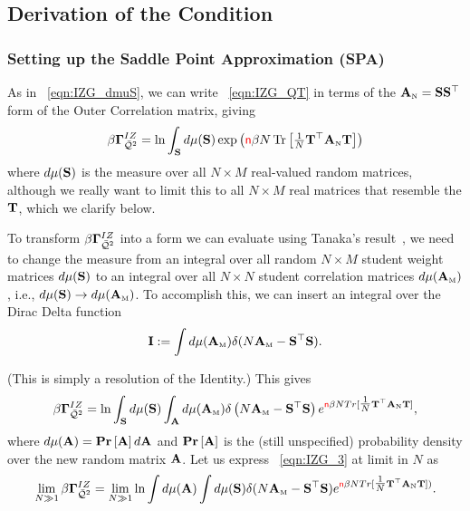 \subsection{Derivation of the \TRACELOG Condition}
\label{sxn:TraceLogDerivation}


\subsubsection{Setting up the Saddle Point Approximation (SPA)}
\label{sxn:TraceLogDerivation_A}
As in \EQN~\ref{eqn:IZG_dmuS}, 
we can write \EQN~\ref{eqn:IZG_QT} in terms of the ${\mathbf{A}}_{\text{\tiny N}} = {\mathbf{S}}{\mathbf{S}}^{\top}$ form of the Outer \Student Correlation matrix, giving
\begin{align}
\beta\mathbf{\Gamma}^{IZ}_{\bar{\mathcal{Q}}^{2}} = \ln\int_{{\mathbf{S}}} d\mu({\mathbf{S}}) \exp\left({\color{red}\sf{n}}\beta N \mbox{}\operatorname{Tr}\left[ \tfrac{1}{N}{\mathbf{T}}^{\top}{\mathbf{A}}_{\text{\tiny N}} {\mathbf{T}} \right] \right)
\end{align}
where $d\mu({\mathbf{S}})$ is the measure over all $N \times M$ real-valued random matrices,
although we really want to limit this to all $N \times M$ real matrices that resemble the \Teacher ${\mathbf{T}}$,
which we clarify below.

To transform $\beta\mathbf{\Gamma}^{IZ}_{\bar{\mathcal{Q}}^{2}}$ into a form we can evaluate using Tanaka's result~\cite{Tanaka2008}, 
we need to change the measure from an integral over all random $N \times M$ student weight matrices
$d\mu({\mathbf{S}})$ to an integral over all $N \times N$
student correlation matrices $d\mu({\mathbf{A}}_{\text{\tiny M}})$, i.e., $d\mu({\mathbf{S}})\rightarrow d\mu({\mathbf{A}}_{\text{\tiny M}})$.
To accomplish this, we can insert an integral over the Dirac Delta function
\begin{align}
  \label{eqn:I}
  \mathbf{I}:=
  \int d\mu({\mathbf{A}}_{\text{\tiny M}})\delta(N{\mathbf{A}}_{\text{\tiny M}}-{\mathbf{S}}^{\top}{\mathbf{S}}).
\end{align}

\noindent
(This is simply a resolution of the Identity.) This gives
\begin{align}
\label{eqn:IZG_3}
\beta\mathbf{\Gamma}^{IZ}_{\bar{\mathcal{Q}}^{2}}= \ln \int_{{\mathbf{S}}} d\mu({\mathbf{S}})\int_{\mathbf{A}} d\mu({\mathbf{A}}_{\text{\tiny M}})
           \delta\left( N{\mathbf{A}}_{\text{\tiny M}}-{\mathbf{S}}^{\top}{\mathbf{S}} \right) 
           e^{ {\color{red}\sf{n}}\beta N Tr[\tfrac{1}{N} {\mathbf{T}}^{\top} {\mathbf{A}}_{\text{\tiny N}}{\mathbf{T}} ] } ,
\end{align}
 where $d\mu(\mathbf{A})=\mbox{}{\bf{Pr}}\left[\mathbf{A}\right]d\mathbf{A}$ and $\mbox{}{\bf{Pr}}\left[\mathbf{A}\right]$ is the
(still unspecified) probability density over the new random matrix $\mathbf{A}$. 
%
Let us express \EQN~\ref{eqn:IZG_3} at \LargeN limit in $N$ as
\begin{align}
  \label{eqn:IZG_4}
  \lim_{N\gg 1}\beta\mathbf{\Gamma}^{IZ}_{\bar{\mathcal{Q}}^{2}} =
  \lim_{N\gg 1}\ln
  \int d\mu(\mathbf{A})
  \int d\mu({\mathbf{S}})
  \delta(N{\mathbf{A}}_{\text{\tiny M}}-{\mathbf{S}}^{\top}{\mathbf{S}})
  e^{ {\color{red}\sf{n}}\beta N Tr[ \tfrac{1}{N}{\mathbf{T}}^{\top}{\mathbf{A}}_{\text{\tiny N}}{\mathbf{T}}]) }  .
\end{align}
 
